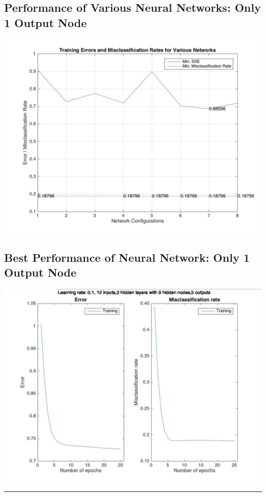 \documentclass[12pt]{article}
\newcommand{\horizontalLine}{
	\begin{center}
		\hrule width 1.0\textwidth
	\end{center}
}
\begin{document}
\subsection{Performance of Various Neural Networks: Only 1 Output Node}
\label{subsec:variousANN}
\includegraphics[scale=0.45]{images/ann/graphOfVariousNetworksWith1Genre}

\subsection{Best Performance of Neural Network: Only 1 Output Node}
\label{subsec:annBestPerformance}
\includegraphics[scale=0.45]{images/ann/bestRun}

\horizontalLine
\end{document}

